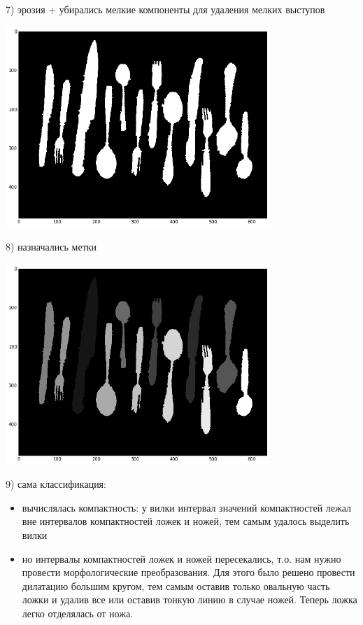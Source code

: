\documentclass[12pt, a4paper]{article}
\begin{document}
            7) эрозия + убирались мелкие компоненты для удаления мелких выступов
            \begin{center}
                \includegraphics[width=10cm]{7.png}
            \end{center}

            8) назначались метки
            \begin{center}
                \includegraphics[width=10cm]{8.png}
            \end{center}

            9) сама классификация:
            \begin{itemize}
                \item вычислялась компактность: у вилки интервал значений компактностей лежал вне интервалов компактностей ложек и ножей, тем самым удалось выделить вилки
                \item но интервалы компактностей ложек и ножей пересекались, т.о. нам нужно провести морфологические преобразования. Для этого было решено провести дилатацию большим кругом, тем самым оставив только овальную часть ложки и удалив все или оставив тонкую линию в случае ножей. Теперь ложка легко отделялась от ножа.
            \end{itemize}
\end{document}
